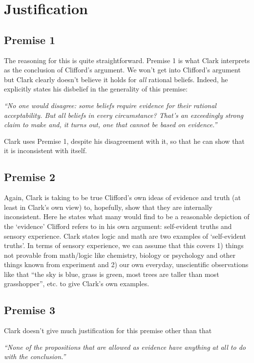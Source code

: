\documentclass{article}
\begin{document}
\section{Justification}
\subsection{Premise 1}
The reasoning for this is quite straightforward. Premise 1 is what Clark interprets as the conclusion of Clifford's argument. We won't get into Clifford's argument but Clark clearly doesn't believe it holds for \textit{all} rational beliefs. Indeed, he explicitly states his disbelief in the generality of this premise:
\begin{displayquote}\textit{``No one would disagree: some beliefs require evidence for their rational acceptability. But \textnormal{all} beliefs in \textnormal{every} circumstance? That’s an exceedingly strong claim to make and, it turns out, one that cannot be based on evidence.''}
\end{displayquote}

Clark uses Premise 1, despite his disagreement with it, so that he can show that it is inconsistent with itself.

\subsection{Premise 2}
Again, Clark is taking to be true Clifford's own ideas of evidence and truth (at least in Clark's own view) to, hopefully, show that they are internally inconsistent. Here he states what many would find to be a reasonable depiction of the `evidence' Clifford refers to in his own argument: self-evident truths and sensory experience. Clark states logic and math are two examples of `self-evident truths'. In terms of sensory experience, we can assume that this covers 1) things not provable from math/logic like chemistry, biology or psychology and other things known from experiment and 2) our own everyday, unscientific observations like that ``the sky is blue, grass is green, most trees are taller than most grasshopper'', etc. to give Clark's own examples.

\subsection{Premise 3}
Clark doesn't give much justification for this premise other than that
\begin{displayquote}\textit{``None of the propositions that are allowed as evidence have anything at all to do with the conclusion.''}
\end{displayquote}
\end{document}
